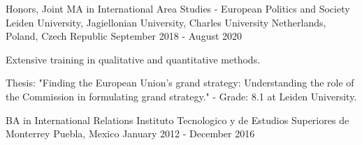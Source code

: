 

\begin{cventries}

  \cventry
    {Honors, Joint MA in International Area Studies - European Politics and Society} %
    {Leiden University, Jagiellonian University, Charles University} %
    {Netherlands, Poland, Czech Republic} %
    {September 2018 - August 2020} %
    {
      \begin{cvitems} %
        \item {Extensive training in qualitative and quantitative methods.}
        \item {Thesis: "Finding the European Union's grand strategy: Understanding the role of the Commission in formulating grand strategy." - Grade: 8.1 at Leiden University.}
      \end{cvitems}
    }
  \cventry
    {BA in International Relations} %
    {Instituto Tecnologico y de Estudios Superiores de Monterrey} %
    {Puebla, Mexico} %
    {January 2012 - December 2016} %
    {
      \begin{cvitems} %
      \end{cvitems}
    }

\end{cventries}
